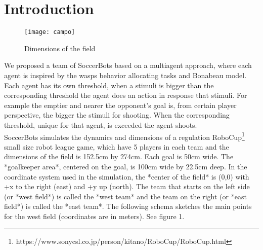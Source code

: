 \documentclass[
10pt, %
a4paper, %
oneside, %
headinclude,footinclude, %
BCOR5mm, %
]{scrartcl}
\begin{document}

{\let\thefootnote\relax{}}


\newpage %


\section{Introduction}

\begin{figure}
	\centering
	\texttt{[image: campo]}
	\caption{Dimensions of the field}
	\label{fig:fig}
\end{figure}

We proposed a team of SoccerBots based on a multiagent approach, where each agent is inspired by the wasps  behavior allocating tasks and Bonabeau model\cite{bonabeau1997adaptive}. Each agent has its own threshold, when a stimuli is bigger than the corresponding threshold the agent does an action in response that stimuli. For example the emptier and nearer the opponent's goal is, from certain player perspective, the bigger the stimuli for shooting. When the corresponding threshold, unique for that agent, is exceeded the agent shoots.\\

SoccerBots simulates the dynamics and dimensions of a regulation RoboCup\footnote{https://www.sonycsl.co.jp/person/kitano/RoboCup/RoboCup.html} small size robot league game, which have 5 players in each team and the dimensions of the field is 152.5cm by 274cm. Each goal is 50cm wide. The *goalkeeper area*, centered on the goal, is 100cm wide by 22.5cm deep. In the coordinate system used in the simulation, the *center of the field* is (0,0) with +x to the right (east) and +y up (north). The team that starts on the left side (or *west field*) is called the *west team* and the team on the right (or *east field*) is called the *east team*. The following schema sketches the main points for the west field (coordinates are in meters). See figure 1.\\
\end{document}
